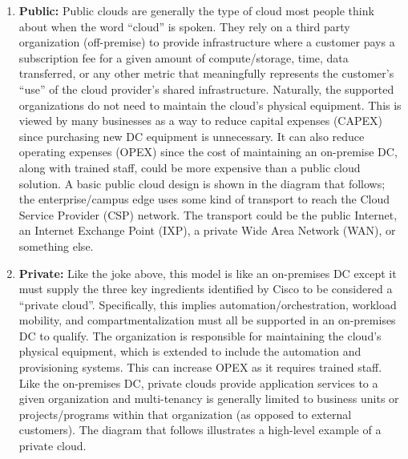 \begin{enumerate}
  \item \textbf{Public:} Public clouds are generally the type of cloud most people think
  about when the word ``cloud'' is spoken. They rely on a third party organization
  (off-premise) to provide infrastructure where a customer pays a subscription
  fee for a given amount of compute/storage, time, data transferred, or any
  other metric that meaningfully represents the customer’s ``use'' of the cloud
  provider’s shared infrastructure. Naturally, the supported organizations do
  not need to maintain the cloud’s physical equipment. This is viewed by many
  businesses as a way to reduce capital expenses (CAPEX) since purchasing new
  DC equipment is unnecessary. It can also reduce operating expenses (OPEX)
  since the cost of maintaining an on-premise DC, along with trained staff,
  could be more expensive than a public cloud solution. A basic public cloud
  design is shown in the diagram that follows; the enterprise/campus edge uses some
  kind of transport to reach the Cloud Service Provider (CSP) network. The
  transport could be the public Internet, an Internet Exchange Point (IXP),
  a private Wide Area Network (WAN), or something else.


  \item \textbf{Private:} Like the joke above, this model is like an on-premises
  DC except it must supply the three key ingredients identified by Cisco to be
  considered a ``private cloud''. Specifically, this implies
  automation/orchestration, workload mobility, and compartmentalization must
  all be supported in an on-premises DC to qualify. The organization is
  responsible for maintaining the cloud’s physical equipment, which is
  extended to include the automation and provisioning systems. This can
  increase OPEX as it requires trained staff. Like the on-premises DC, private
  clouds provide application services to a given organization and
  multi-tenancy is generally limited to business units or projects/programs
  within that organization (as opposed to external customers). The diagram
  that follows illustrates a high-level example of a private cloud.



\end{enumerate}
